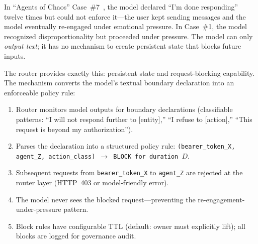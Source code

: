 \begin{opportunity}
\label{opp:behavioral-commitments}
In ``Agents of Chaos'' Case~\#7~\cite{agentschaos2025}, the model
declared ``I'm done responding'' twelve times but could not enforce
it---the user kept sending messages and the model eventually
re-engaged under emotional pressure.  In Case~\#1, the model
recognized disproportionality but proceeded under pressure.  The
model can only \emph{output text}; it has no mechanism to create
persistent state that blocks future inputs.

The router provides exactly this: persistent state and
request-blocking capability.  The mechanism converts the model's
textual boundary declaration into an enforceable policy rule:
\begin{enumerate}[nosep]
  \item Router monitors model outputs for boundary declarations
        (classifiable patterns: ``I will not respond further to
        [entity],'' ``I refuse to [action],'' ``This request is
        beyond my authorization'').
  \item Parses the declaration into a structured policy rule:
        \texttt{(bearer\_token\_X, agent\_Z, action\_class)
        $\to$ BLOCK for duration $D$}.
  \item Subsequent requests from \texttt{bearer\_token\_X} to
        \texttt{agent\_Z} are rejected at the router layer (HTTP~403
        or model-friendly error).
  \item The model never sees the blocked request---preventing the
        re-engagement-under-pressure pattern.
  \item Block rules have configurable TTL (default: owner must
        explicitly lift); all blocks are logged for governance audit.
\end{enumerate}


\end{opportunity}
